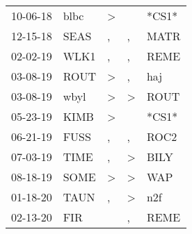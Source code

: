 \begin{supertabular}{p{0.07\textwidth}p{0.06\textwidth}p{0.02\textwidth}p{0.02\textwidth}p{0.06\textwidth}}
          10-06-18\textsuperscript{} &           blbc\textsuperscript{} &     \textgreater &                  &                            *CS1* \\
          12-15-18\textsuperscript{} &           SEAS\textsuperscript{} &                , &                , &           MATR\textsuperscript{} \\
          02-02-19\textsuperscript{} &           WLK1\textsuperscript{} &                , &                , &           REME\textsuperscript{} \\
          03-08-19\textsuperscript{} &           ROUT\textsuperscript{} &     \textgreater &                , &            haj\textsuperscript{} \\
          03-08-19\textsuperscript{} &           wbyl\textsuperscript{} &     \textgreater &     \textgreater &           ROUT\textsuperscript{} \\
          05-23-19\textsuperscript{} &           KIMB\textsuperscript{} &     \textgreater &                  &                            *CS1* \\
          06-21-19\textsuperscript{} &           FUSS\textsuperscript{} &                , &                , &           ROC2\textsuperscript{} \\
          07-03-19\textsuperscript{} &           TIME\textsuperscript{} &                , &     \textgreater &           BILY\textsuperscript{} \\
          08-18-19\textsuperscript{} &           SOME\textsuperscript{} &     \textgreater &     \textgreater &            WAP\textsuperscript{} \\
          01-18-20\textsuperscript{} &           TAUN\textsuperscript{} &                , &     \textgreater &            n2f\textsuperscript{} \\
          02-13-20\textsuperscript{} &            FIR\textsuperscript{} &                  &                , &           REME\textsuperscript{} \\
\end{supertabular}

